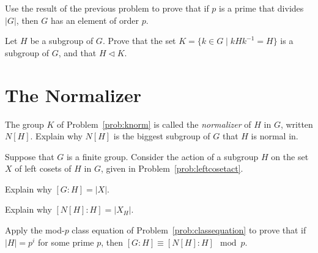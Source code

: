 \begin{problem}\label{prob:cauchy}
Use the result of the previous problem to prove that if $p$ is a prime that divides $\lvert G \rvert$, then $G$ has an element of order $p$.
\begin{annotation}
\end{annotation}
\end{problem}

\begin{problem}\label{prob:knorm}
Let $H$ be a subgroup of $G$.  Prove that the set $K = \{ k \in G \mid kHk^{-1} = H\}$ is a subgroup of $G$, and that $H \lhd K$.
\end{problem}

\section{The Normalizer}

\begin{problem}\label{prob:biggestnorm}
The group $K$ of Problem~\ref{prob:knorm} is called the \emph{normalizer} of $H$ in $G$, written $N[H]$.  Explain why $N[H]$ is the biggest subgroup of $G$ that $H$ is normal in.
\begin{annotation}
\end{annotation}
\end{problem}

\begin{problem}
Suppose that $G$ is a finite group. Consider the action of a subgroup $H$ on the set $X$ of left cosets of $H$ in $G$, given in Problem~\ref{prob:leftcosetact}.
\begin{problemparts}
 \item Explain why $[G:H] = \lvert X \rvert$.
 \item Explain why $[N[H]:H] = \lvert X_H \rvert$.
\end{problemparts}
\end{problem}

\begin{problem}\label{prob:pgroupnorm}
Apply the mod-$p$ class equation of Problem~\ref{prob:classequation} to prove that if $\lvert H \rvert = p^i$ for some prime $p$, then $[G:H] \equiv [N[H]:H] \mod p$.
\begin{annotation}
\end{annotation}
\end{problem}


